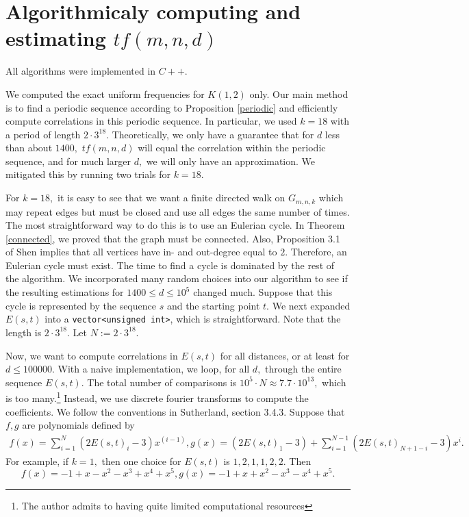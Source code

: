\documentclass[11pt]{amsart} %
\begin{document}
\section{Algorithmicaly computing and estimating $tf(m, n, d)$}
All algorithms were implemented in $C++.$

We computed the exact uniform frequencies for $K(1, 2)$ only. 
Our main method is to find a periodic sequence according to Proposition \ref{periodic} and efficiently compute correlations in this periodic sequence. In particular, we used $k = 18$ with a period of length $2 \cdot 3^{18}.$ Theoretically, we only have a guarantee that for $d$ less than about $1400,$ $tf(m,n,d)$ will equal the correlation within the periodic sequence, and for much larger $d,$ we will only have an approximation. We mitigated this by running two trials for $k = 18.$ 

For $k = 18,$ it is easy to see that we want a finite directed walk on $G_{m, n, k}$ which may repeat edges but must be closed and use all edges the same number of times. The most straightforward way to do this is to use an Eulerian cycle.  In Theorem \ref{connected}, we proved that the graph must be connected. Also, Proposition 3.1 of Shen \cite{Shen} implies that all vertices have in- and out-degree equal to $2.$ Therefore, an Eulerian cycle must exist. The time to find a cycle is dominated by the rest of the algorithm. We incorporated many random choices into our algorithm to see if the resulting estimations for $1400 \le d \le 10^5$ changed much. Suppose that this cycle is represented by the sequence $s$ and the starting point $t.$ We next expanded $E(s, t)$ into a \texttt{vector<unsigned int>}, which is straightforward. Note that the length is $2 \cdot 3^{18}.$ Let $N:=2 \cdot 3^{18}.$

Now, we want to compute correlations in $E(s, t)$ for all distances, or at least for $d \le 100000.$ With a naive implementation, we loop, for all $d,$ through the entire sequence $E(s, t).$ The total number of comparisons is $10^5 \cdot N\approx 7.7 \cdot 10^{13},$ which is too many.\footnote{The author admits to having quite limited computational resources} Instead, we use discrete fourier transforms to compute the coefficients. We follow the conventions in Sutherland\cite{Suth}, section 3.4.3. Suppose that $f, g$ are polynomials defined by
\begin{align}\label{fg}f(x) = \sum_{i=1}^{N} (2 E(s, t)_i - 3) x^{(i-1)}, g(x) = (2 E(s, t)_1 - 3) +  \sum_{i=1}^{N - 1} (2 E(s, t)_{N + 1 - i} - 3) x^{i}.\end{align}
For example, if $k = 1,$ then one choice for $E(s,t)$ is $1,2,1,1,2,2.$ Then 
\[ f(x) = -1 + x - x^2 - x^3 + x^4 + x^5, g(x) = -1 + x + x^2 - x^3 - x^4 + x^5.\]
\end{document}
